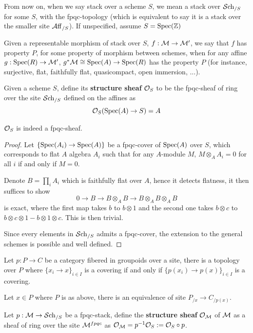 From now on, when we say stack over a scheme $S$, we mean a stack over $\mathcal{S}\mathrm{ch}_{/S}$ for some $S$, with the fpqc-topology (which is equivalent to say it is a stack over the smaller site $\operatorname{\mathcal{A}ff}_{/S}$). If unspecified, assume $S=\operatorname{\mathrm{Spec}}(\mathbb{Z})$

\begin{definition}
    Given a representable morphism of stack over $S$, $f:\mathcal{M}\to \mathcal{M}'$, we say that $f$ has property $P$, for some property of morphism between schemes, when for any affine $g:\operatorname{\mathrm{Spec}}(R)\to \mathcal{M}'$, $g^*\mathcal{M}\cong \operatorname{\mathrm{Spec}}(A)\to \operatorname{\mathrm{Spec}}(R)$ has the property $P$ (for instance, surjective, flat, faithfully flat, quasicompact, open immersion, ...).
\end{definition}

\begin{definition}
    Given a scheme $S$, define its \textbf{structure sheaf} $\mathcal{O}_S$ to be the fpqc-sheaf of ring over the site $\mathcal{S}\mathrm{ch}_{/S}$ defined on the affines as
    \[
    \mathcal{O}_{S}(\operatorname{\mathrm{Spec}}(A)\to S)=A
    \]
\end{definition}

\begin{lemma}
    $\mathcal{O}_S$ is indeed a fpqc-sheaf.
\end{lemma}

\begin{proof}
    Let $\{\operatorname{\mathrm{Spec}}(A_i)\to \operatorname{\mathrm{Spec}}(A)\}$ be a fpqc-cover of $\operatorname{\mathrm{Spec}}(A)$ over $S$, which corresponds to flat $A$ algebra $A_i$ such that for any $A$-module $M$, $M\otimes_A A_i=0$ for all $i$ if and only if $M=0$. 

    Denote $B=\prod_i A_i$ which is faithfully flat over $A$, hence it detects flatness, it then suffices to show 
    \[
    0 \to B\to B\otimes_A B\to B\otimes_A B\otimes_AB
    \]is exact, where the first map takes $b$ to $b\otimes 1$ and the second one takes $b\otimes c$ to $b\otimes c\otimes 1- b\otimes 1\otimes c$. This is then trivial.
    
    Since every elements in $\mathcal{S}\mathrm{ch}_{/S}$ admits a fpqc-cover, the extension to the general schemes is possible and well defined.
\end{proof}

\begin{theorem}
\cite{AGStacksProject}

Let $p:P\to C$ be a category fibered in groupoids over a site, there is a topology over $P$ where $\{x_i\to x\}_{i\in I}$ is a covering if and only if $\{p(x_i)\to p(x)\}_{i \in I}$ is a covering.
\end{theorem}

\begin{lemma}
    Let $x \in P$ where $P$ is as above, there is an equivalence of site $P_{/x}\to C_{/p(x)}$.
\end{lemma}

\begin{definition}
    Let $p:\mathcal{M}\to \mathcal{S}\mathrm{ch}_{/S}$ be a fpqc-stack, define the \textbf{structure sheaf} $\mathcal{O}_{\mathcal{M}}$ of $\mathcal{M}$ as a sheaf of ring over the site $\mathcal{M}^{fpqc}$ as $\mathcal{O}_{\mathcal{M}}=p^{-1}\mathcal{O}_{S}:=\mathcal{O}_S\circ p$.
\end{definition}
